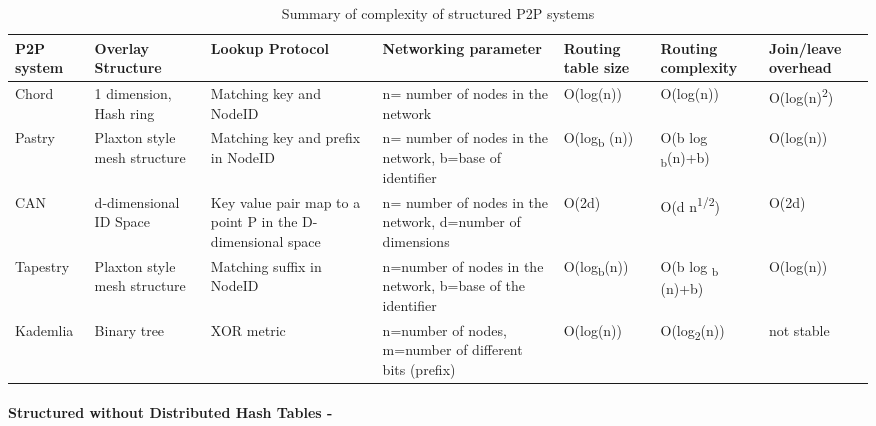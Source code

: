 \begin{table}
  \begin{tabular}{| p{1.3cm} | p{1.6cm} | p{1.9cm} | p{1.8cm} | p{1.6cm} | p{1.8cm} | p{1.8cm} |}
    \hline                        
    \textbf{P2P system} & \textbf{Overlay Structure} & \textbf{Lookup Protocol} & \textbf{Networking parameter} & \textbf{Routing table size} & \textbf{Routing complexity} & \textbf{Join/leave overhead} \\
    
    \hline
    Chord & 1 dimension, Hash ring & Matching key and NodeID & n= number of nodes in the network & O(log(n)) & O(log(n)) & O(log(n)\textsuperscript{2}) \\
    
    \hline
    Pastry & Plaxton style mesh structure & Matching key and prefix in NodeID & n= number of nodes in the network, b=base of identifier & O(log\textsubscript{b} (n)) & O(b log \textsubscript{b}(n)+b) & O(log(n)) \\
    
    \hline
    CAN & d-dimensional ID Space & Key value pair map to a point P in the D-dimensional space & n= number of nodes in the network, d=number of dimensions & O(2d) & O(d n\textsuperscript{1/2}) & O(2d) \\
    
    \hline
    Tapestry & Plaxton style mesh structure & Matching suffix in NodeID & n=number of nodes in the network, b=base of the identifier & O(log\textsubscript{b}(n)) & O(b log \textsubscript{b} (n)+b) & O(log(n)) \\
    
    \hline  
    Kademlia & Binary tree & XOR metric & n=number of nodes, m=number of different bits (prefix) & O(log(n)) & O(log\textsubscript{2}(n)) & not stable \\
    \hline      
  \end{tabular}
  \caption{Summary of complexity of structured P2P systems}
  \label{table:Complexity of structured P2P systems using a DHT}
\end{table}


\paragraph{\textbf{Structured without Distributed Hash Tables -}} %
\label{par:Structured without Non-Distributed Hash Tables}

